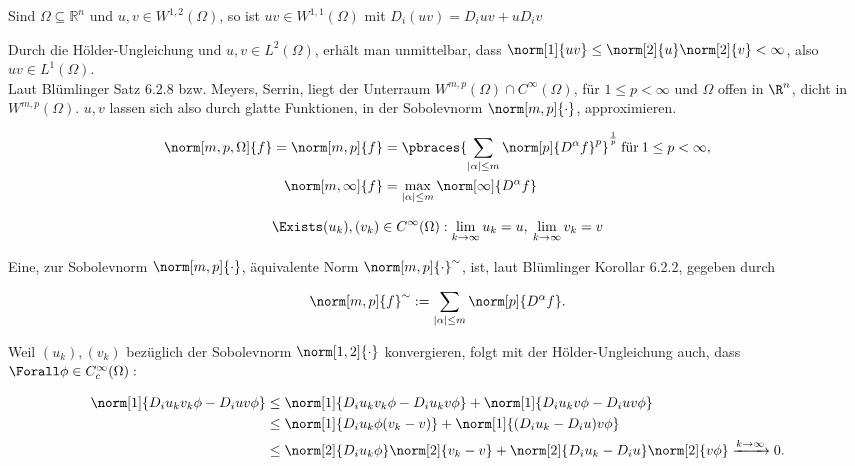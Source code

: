 \begin{exercise}

Sind $\Omega\subseteq\mathbb{R}^n$ und $u,v \in W^{1,2}(\Omega)$, so ist $uv \in W^{1,1}(\Omega)$ mit $D_i(uv) = D_iuv + uD_iv$

\end{exercise}


\begin{solution}

Durch die Hölder-Ungleichung und $u, v \in L^2(\Omega)$, erhält man unmittelbar, dass $\norm[1]{uv} \leq \norm[2]{u} \norm[2]{v} < \infty$, also $uv \in L^1(\Omega)$. \\

Laut Blümlinger Satz 6.2.8 bzw. Meyers, Serrin, liegt der Unterraum $W^{m, p}(\Omega) \cap C^\infty(\Omega)$, für $1 \leq p < \infty$ und $\Omega$ offen in $\R^n$, dicht in $W^{m, p}(\Omega)$. $u, v$ lassen sich also durch glatte Funktionen, in der Sobolevnorm $\norm[m, p]{\cdot}$, approximieren.

\begin{align*}
  \norm[m, p, \Omega]{f} =
  \norm[m, p]{f} & =
  \pbraces
  {
    \sum_{|\alpha| \leq m}
    \norm[p]{D^\alpha f}^p
  }^\frac{1}{p} \:
  \text{für} \:
  1 \leq p < \infty, \\
  \norm[m, \infty]{f} & =
  \max_{|\alpha| \leq m}
  \norm[\infty]{D^\alpha f}
\end{align*}

\begin{align*}
  \Exists (u_k), (v_k) \in C^\infty(\Omega):
  \lim_{k \to \infty} u_k = u, \:
  \lim_{k \to \infty} v_k = v
\end{align*}

Eine, zur Sobolevnorm $\norm[m, p]{\cdot}$, äquivalente Norm $\norm[m, p]{\cdot}^\sim$, ist, laut Blümlinger Korollar 6.2.2, gegeben durch

\begin{align*}
  \norm[m, p]{f}^\sim :=
  \sum_{|\alpha| \leq m}
  \norm[p]{D^\alpha f}.
\end{align*}

Weil $(u_k), (v_k)$ bezüglich der Sobolevnorm $\norm[1, 2]{\cdot}$ konvergieren, folgt mit der Hölder-Ungleichung auch, dass $\Forall \phi \in C_c^\infty(\Omega):$

\begin{align*}
  \norm[1]{D_i u_k v_k \phi - D_i uv \phi}
  & \leq \norm[1]{D_i u_k v_k \phi - D_i u_k v \phi} +
        \norm[1]{D_i u_k v \phi - D_i uv \phi} \\
  & \leq \norm[1]{D_i u_k \phi (v_k - v)} +
         \norm[1]{(D_i u_k - D_i u) v \phi} \\
  & \leq \norm[2]{D_i u_k \phi}
         \norm[2]{v_k - v} +
         \norm[2]{D_i u_k - D_i u}
         \norm[2]{v \phi}
         \xrightarrow{k \to \infty} 0.
\end{align*}


\end{solution}

